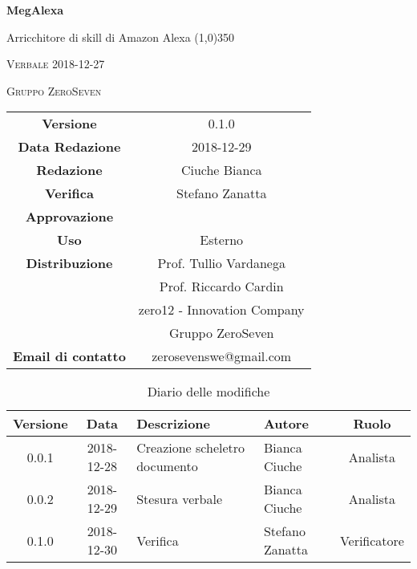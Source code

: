 \documentclass[a4paper,12pt]{article}
\author{Bianca Ciuche}
\date{2018-12-27}
\begin{document}
\begin{titlepage}
	\centering
	{\huge\bfseries MegAlexa\par}
	Arricchitore di skill di Amazon Alexa
	\line(1,0){350} \\
	{\scshape\LARGE Verbale 2018-12-27 \par}
	\vspace{1cm}
	{\scshape Gruppo ZeroSeven \par}
	\logo
	\begin{tabular}{c|c}
		{\hfill \textbf{Versione}} 			& 0.1.0				\\
		{\hfill\textbf{Data Redazione}} 	& 2018-12-29		\\ 
		{\hfill\textbf{Redazione}} 			&  		Ciuche Bianca		\\ 
		{\hfill\textbf{Verifica}} 				&  	Stefano Zanatta			\\ 
		{\hfill\textbf{Approvazione}} 		&  			\\ 
		{\hfill\textbf{Uso}} 					& 	Esterno	\\ 
		{\hfill\textbf{Distribuzione}} 			& 			Prof. Tullio Vardanega \\ & Prof. Riccardo Cardin \\ & zero12 - Innovation Company \\ & Gruppo ZeroSeven		\\ 
		{\hfill\textbf{Email di contatto}} & zerosevenswe@gmail.com \\
	\end{tabular}
\end{titlepage}
	
		\label{LastFrontPage}
	
	
	\newpage
	\cleardoublepage
	\begin{table}[tbph]
		\centering
		\begin{tabularx}{\textwidth}{|c|c|X|X|c|}
			\hline
			\textbf{Versione} & \textbf{Data} & \textbf{Descrizione} & \textbf{Autore} & \textbf{Ruolo} \\
			\hline
			0.0.1 & 2018-12-28 & Creazione scheletro documento
			& Bianca Ciuche & Analista\\
			\hline
			0.0.2 & 2018-12-29 & Stesura verbale & Bianca Ciuche &Analista \\
			\hline
			0.1.0 & 2018-12-30 & Verifica & Stefano Zanatta &Verificatore \\
			\hline
		\end{tabularx}
		\caption{Diario delle modifiche}
	\end{table}
	
\end{document}
